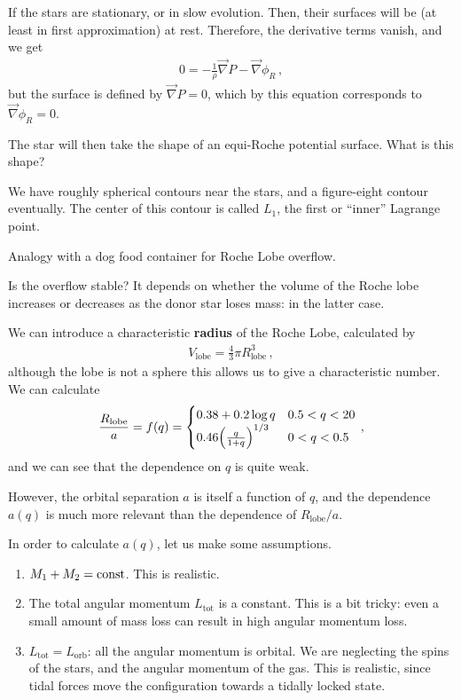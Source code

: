 \documentclass[main.tex]{subfiles}
\begin{document}
If the stars are stationary, or in slow evolution. Then, their surfaces will be (at least in first approximation) at rest. Therefore, the derivative terms vanish, and we get 
%
\begin{align}
0  = - \frac{1}{\rho } \vec{\nabla} P - \vec{\nabla} \phi _R
\,,
\end{align}
%
but the surface is defined by \(\vec{\nabla} P = 0\), which by this equation corresponds to \(\vec{\nabla} \phi _R = 0\). 

The star will then take the shape of an equi-Roche potential surface. 
What is this shape? 


We have roughly spherical contours near the stars, and a figure-eight contour eventually.
The center of this contour is called \(L_1 \), the first or ``inner'' Lagrange point. 

Analogy with a dog food container for Roche Lobe overflow.

Is the overflow stable? It depends on whether the volume of the Roche lobe increases or decreases as the donor star loses mass: in the latter case. 


We can introduce a characteristic \textbf{radius} of the Roche Lobe, calculated by 
%
\begin{align}
V _{\text{lobe}} = \frac{4}{3} \pi R _{\text{lobe}}^3
\,,
\end{align}
%
although the lobe is not a sphere this allows us to give a characteristic number. 
We can calculate 
%
\begin{align}
\frac{R_{\text{lobe}}}{a} = f(q) =
\begin{cases}
    \num{.38} + \num{.2} \log q  & \num{.5} < q < \num{20}\\
    \num{.46}  \qty( \frac{q}{1 + q})^{1/3}
    & 0 < q < \num{.5}
\end{cases} 
\,,
\end{align}
%
and we can see that the dependence on \(q\) is quite weak. 

However, the orbital separation \(a\) is itself a function of \(q\), and the dependence \(a(q)\) is much more relevant than the dependence of \(R _{\text{lobe}} / a\). 

In order to calculate \(a(q)\), let us make some assumptions. 
\begin{enumerate}
    \item \(M_1 + M_2 = \text{const}\). This is realistic.
    \item The total angular momentum \(L _{\text{tot}}\) is a constant. This is a bit tricky: even a small amount of mass loss can result in high angular momentum loss. 
    \item \(L _{\text{tot}} = L _{\text{orb}}\): all the angular momentum is orbital. We are neglecting the spins of the stars, and the angular momentum of the gas. This is realistic, since tidal forces move the configuration towards a tidally locked state. 
\end{enumerate}
\end{document}
